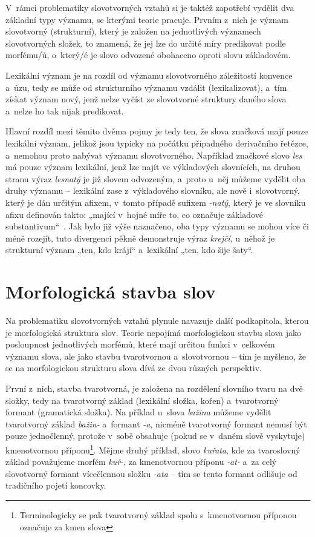 V~rámci problematiky slovotvorných vztahů si je taktéž zapotřebí vydělit
dva základní typy významu, se kterými teorie pracuje. Prvním z~nich je
význam slovotvorný (strukturní), který je založen na jednotlivých
významech slovotvorných složek, to znamená, že jej lze do určité míry
predikovat podle morfému/ů, o~který/é je slovo odvozené obohaceno oproti
slovu základovém.~\parencite{enc-slovot-vyznam17}

Lexikální význam je na rozdíl od významu slovotvorného záležitostí
konvence a~úzu, tedy se může od strukturního významu vzdálit
(lexikalizovat), a~tím získat význam nový, jenž nelze vyčíst ze
slovotvorné struktury daného slova a~nelze ho tak nijak predikovat.
\parencite{enc-slovot-vyznam17}

Hlavní rozdíl mezi těmito dvěma pojmy je tedy ten, že slova značková
mají pouze lexikální význam, jelikož jsou typicky na počátku případného
derivačního řetězce, a~nemohou proto nabývat významu slovotvorného.
Například značkové slovo \emph{les} má pouze význam lexikální, jenž lze
najít ve výkladových slovnících, na druhou stranu výraz \emph{lesnatý}
je již slovem odvozeným, a~proto u~něj můžeme vydělit oba druhy významu
-- lexikální zase z~výkladového slovníku, ale nově i~slovotvorný, který
je dán určitým afixem, v~tomto případě sufixem \emph{-natý}, který je ve
slovníku afixu definován takto: „mající v~hojné míře to, co označuje
základové substantivum``~\parencite{simandl2016}. Jak bylo již výše
naznačeno, oba typy významu se mohou více či méně rozejít, tuto
divergenci pěkně demonstruje výraz \emph{krejčí}, u~něhož je strukturní
význam „ten, kdo krájí`` a~lexikální „ten, kdo šije šaty``.

\hypertarget{morfologickuxe1-stavba-slov}{%
\section{Morfologická stavba
slov}\label{morfologickuxe1-stavba-slov}}

Na problematiku slovotvorných vztahů plynule navazuje další podkapitola,
kterou je morfologická struktura slov. Teorie nepojímá morfologickou
stavbu slova jako posloupnost jednotlivých morfémů, které mají určitou
funkci v~celkovém významu slova, ale jako stavbu tvarotvornou
a~slovotvornou -- tím je myšleno, že se na morfologickou strukturu slova
dívá ze dvou různých perspektiv.~\parencite[118]{dokulil62}

První z~nich, stavba tvarotvorná, je založena na rozdělení slovního
tvaru na dvě složky, tedy na tvarotvorný základ (lexikální složka,
kořen) a~tvarotvorný formant (gramatická složka). Na příklad u~slova
\emph{bažina} můžeme vydělit tvarotvorný základ \emph{bažin-} a~formant
\emph{-a}, nicméně tvarotvorný formant nemusí být pouze jednočlenný,
protože v~sobě obsahuje (pokud se v~daném slově vyskytuje) kmenotvornou
příponu\footnote{Terminologicky se pak tvarotvorný základ spolu s~kmenotvornou příponou označuje za kmen slova}.
Mějme druhý příklad, slovo \emph{kuřata}, kde za tvaroslovný základ
považujeme morfém \emph{kuř-}, za kmenotvornou příponu \emph{-at-} a~za
celý slovotvorný formant vícečlennou složku \emph{-ata} -- tím se tento
formant odlišuje od tradičního pojetí koncovky.
\parencite{enc-tvar-zaklad17}

